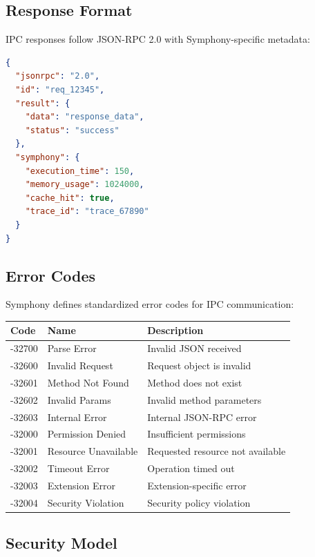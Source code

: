 \subsection*{Response Format}

IPC responses follow JSON-RPC 2.0 with Symphony-specific metadata:

\begin{lstlisting}[language=JSON,caption={IPC Response Structure}]
{
  "jsonrpc": "2.0",
  "id": "req_12345",
  "result": {
    "data": "response_data",
    "status": "success"
  },
  "symphony": {
    "execution_time": 150,
    "memory_usage": 1024000,
    "cache_hit": true,
    "trace_id": "trace_67890"
  }
}
\end{lstlisting}

\subsection*{Error Codes}

Symphony defines standardized error codes for IPC communication:

\begin{center}
\begin{tabular}{@{}lll@{}}
\toprule
\textbf{Code} & \textbf{Name} & \textbf{Description} \\
\midrule
-32700 & Parse Error & Invalid JSON received \\
-32600 & Invalid Request & Request object is invalid \\
-32601 & Method Not Found & Method does not exist \\
-32602 & Invalid Params & Invalid method parameters \\
-32603 & Internal Error & Internal JSON-RPC error \\
-32000 & Permission Denied & Insufficient permissions \\
-32001 & Resource Unavailable & Requested resource not available \\
-32002 & Timeout Error & Operation timed out \\
-32003 & Extension Error & Extension-specific error \\
-32004 & Security Violation & Security policy violation \\
\bottomrule
\end{tabular}
\end{center}

\subsection*{Security Model}

